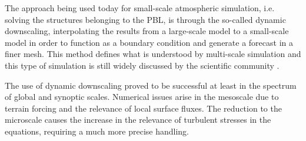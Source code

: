 The approach being used today for small-scale atmospheric simulation, i.e. solving the structures belonging to the PBL, is through the so-called dynamic downscaling, interpolating the results from a large-scale model to a small-scale model in order to function as a boundary condition and generate a forecast in a finer mesh. This method defines what is understood by multi-scale simulation and this type of simulation is still widely discussed by the scientific community \citep{Arnold2010}.

The use of dynamic downscaling proved to be successful at least in the spectrum of global and synoptic scales. Numerical issues arise in the mesoscale due to terrain forcing and the relevance of local surface fluxes. The reduction to the microscale causes the increase in the relevance of turbulent stresses in the equations, requiring a much more precise handling.



